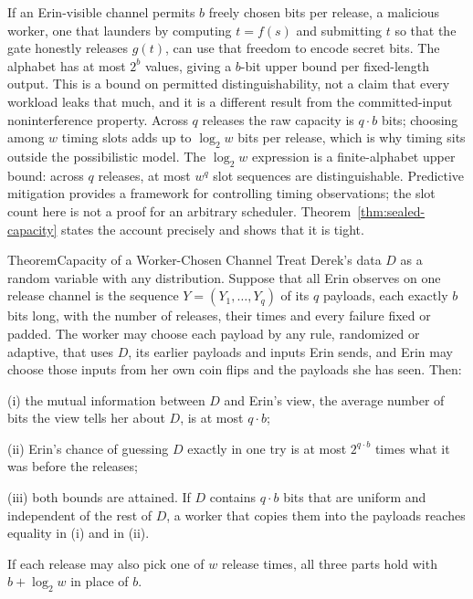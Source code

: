 \documentclass[11pt,a4paper]{article}
\theoremstyle{definition}
\begin{document}
If an Erin-visible channel permits $b$
freely chosen bits per release, a malicious worker, one that launders by computing
$t=f(s)$ and submitting $t$ so that the gate honestly releases $g(t)$, can use that freedom to encode secret bits. The alphabet has at most $2^b$
values, giving a $b$-bit upper bound per fixed-length output. This is a bound
on permitted distinguishability, not a claim that every workload leaks that
much, and it is a different result from the committed-input noninterference
property. Across $q$ releases the raw capacity is $q\cdot b$ bits; choosing among
$w$ timing slots adds up to $\log_2 w$ bits per release, which is why timing sits
outside the possibilistic model. The $\log_2 w$ expression is a finite-alphabet
upper bound: across $q$ releases, at most $w^q$ slot sequences are
distinguishable. Predictive mitigation  provides a framework for
controlling timing observations; the slot count here is not a proof for an
arbitrary scheduler. Theorem~\ref{thm:sealed-capacity} states the account
precisely and shows that it is tight.

\begin{pdclaim}{Theorem}{Capacity of a Worker-Chosen Channel}
\setlength{\parskip}{4pt plus 1pt}
\label{thm:sealed-capacity}
Treat Derek's data $D$ as a random variable with any distribution. Suppose
that all Erin observes on one release channel is the sequence
$Y=(Y_1,\dots,Y_q)$ of its $q$ payloads, each exactly $b$ bits long, with
the number of releases, their times and every failure fixed or padded. The
worker may choose each payload by any rule, randomized or adaptive, that uses
$D$, its earlier payloads and inputs Erin sends, and Erin may choose those
inputs from her own coin flips and the payloads she has seen. Then:

(i) the mutual information between $D$ and Erin's view, the average number
of bits the view tells her about $D$, is at most $q\cdot b$;

(ii) Erin's chance of guessing $D$ exactly in one try is at most
$2^{q\cdot b}$ times what it was before the releases;

(iii) both bounds are attained. If $D$ contains $q\cdot b$ bits that are
uniform and independent of the rest of $D$, a worker that copies them into
the payloads reaches equality in (i) and in (ii).

If each release may also pick one of $w$ release times, all three parts hold
with $b+\log_2 w$ in place of $b$.
\end{pdclaim}
\end{document}
